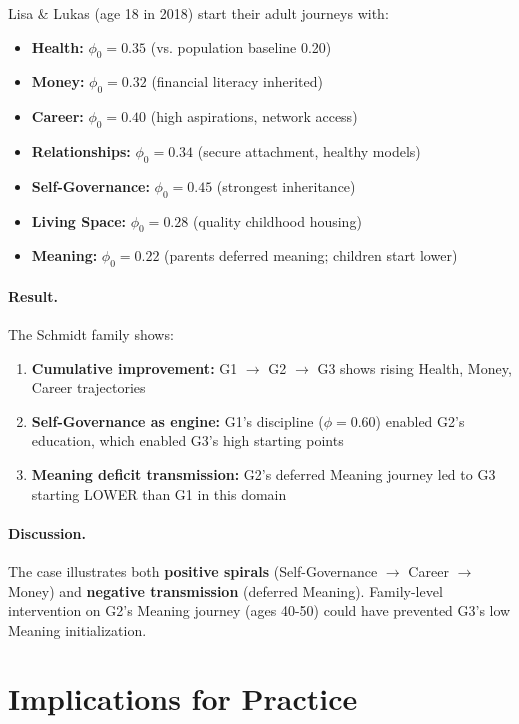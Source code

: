 Lisa \& Lukas (age 18 in 2018) start their adult journeys with:
\begin{itemize}[nosep]
\item \textbf{Health:} $\phi_0 = 0.35$ (vs. population baseline 0.20)
\item \textbf{Money:} $\phi_0 = 0.32$ (financial literacy inherited)
\item \textbf{Career:} $\phi_0 = 0.40$ (high aspirations, network access)
\item \textbf{Relationships:} $\phi_0 = 0.34$ (secure attachment, healthy models)
\item \textbf{Self-Governance:} $\phi_0 = 0.45$ (strongest inheritance)
\item \textbf{Living Space:} $\phi_0 = 0.28$ (quality childhood housing)
\item \textbf{Meaning:} $\phi_0 = 0.22$ (parents deferred meaning; children start lower)
\end{itemize}

\paragraph{Result.} The Schmidt family shows:
\begin{enumerate}
\item \textbf{Cumulative improvement:} G1 $\rightarrow$ G2 $\rightarrow$ G3 shows rising Health, Money, Career trajectories
\item \textbf{Self-Governance as engine:} G1's discipline ($\phi = 0.60$) enabled G2's education, which enabled G3's high starting points
\item \textbf{Meaning deficit transmission:} G2's deferred Meaning journey led to G3 starting LOWER than G1 in this domain
\end{enumerate}

\paragraph{Discussion.} The case illustrates both \textbf{positive spirals} (Self-Governance $\rightarrow$ Career $\rightarrow$ Money)
and \textbf{negative transmission} (deferred Meaning). Family-level intervention on G2's Meaning journey (ages 40-50)
could have prevented G3's low Meaning initialization.


\section{Implications for Practice}
\label{sec:BI-practice}

